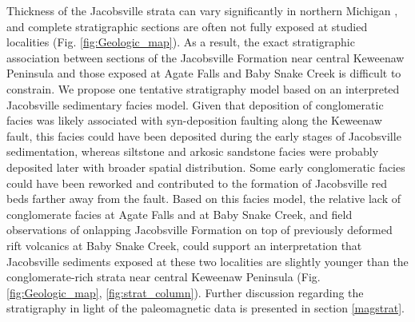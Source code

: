 \documentclass[draft]{agujournal2019}
\begin{document}
Thickness of the Jacobsville strata can vary significantly in northern Michigan \cite{Hamblin1958a, Kalliokoski1982a}, and complete stratigraphic sections are often not fully exposed at studied localities (Fig. \ref{fig:Geologic_map}). As a result, the exact stratigraphic association between sections of the Jacobsville Formation near central Keweenaw Peninsula and those exposed at Agate Falls and Baby Snake Creek is difficult to constrain. We propose one tentative stratigraphy model based on an interpreted Jacobsville sedimentary facies model. Given that deposition of conglomeratic facies was likely associated with syn-deposition faulting along the Keweenaw fault, this facies could have been deposited during the early stages of Jacobsville sedimentation, whereas siltstone and arkosic sandstone facies were probably deposited later with broader spatial distribution. Some early conglomeratic facies could have been reworked and contributed to the formation of Jacobsville red beds farther away from the fault. Based on this facies model, the relative lack of conglomerate facies at Agate Falls and at Baby Snake Creek, and field observations of onlapping Jacobsville Formation on top of previously deformed rift volcanics at Baby Snake Creek, could support an interpretation that Jacobsville sediments exposed at these two localities are slightly younger than the conglomerate-rich strata near central Keweenaw Peninsula (Fig. \ref{fig:Geologic_map}, \ref{fig:strat_column}). Further discussion regarding the stratigraphy in light of the paleomagnetic data is presented in section \ref{magstrat}. 

\end{document}
